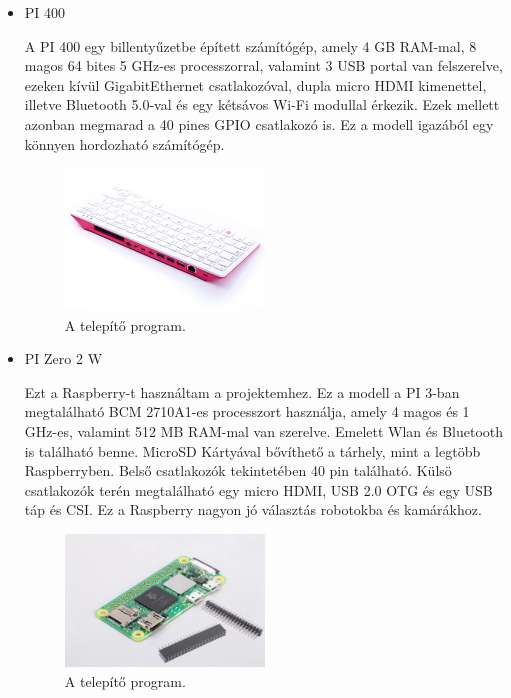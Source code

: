 \documentclass[a4paper,12pt,oneside]{report}
\begin{document}
\begin{itemize}
	\item{PI 400}

	A PI 400 egy billentyűzetbe épített számítógép, amely 4 GB RAM-mal, 8 magos 64 bites 5 GHz-es processzorral, valamint 3 USB portal 
	van felszerelve, ezeken kívül GigabitEthernet csatlakozóval, dupla micro HDMI kimenettel, illetve Bluetooth 5.0-val és 
	egy kétsávos Wi-Fi modullal érkezik. Ezek mellett azonban megmarad a 40 pines GPIO csatlakozó is.
	Ez a modell igazából egy könnyen hordozható számítógép.
	\begin{figure}[htbp]
		\centering
		\includegraphics[width=0.5\textwidth]{fig/pi400.png}
		\caption{A telepítő program.}
		\label{fig-pi400}
	\end{figure}

	\item{PI Zero 2 W}

	Ezt a Raspberry-t használtam a projektemhez.
	Ez a modell a PI 3-ban megtalálható BCM 2710A1-es processzort használja, amely 4 magos és 1 GHz-es, valamint 512 MB RAM-mal 
	van szerelve.
	Emelett Wlan és Bluetooth is található benne. MicroSD Kártyával bővíthető a tárhely, mint a legtöbb Raspberryben.
	Belső csatlakozók tekintetében 40 pin található.
	Külsö csatlakozók terén megtalálható egy micro HDMI, USB 2.0 OTG és egy USB táp és CSI.
	Ez a Raspberry nagyon jó választás robotokba és kamárákhoz.
	\begin{figure}[htbp]
		\centering
		\includegraphics[width=0.5\textwidth]{fig/pi0.png}
		\caption{A telepítő program.}
		\label{fig-pi0}
	\end{figure}
		
	\end{itemize}
\end{document}
